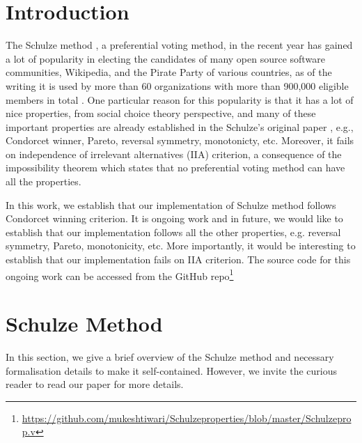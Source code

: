 \documentclass[compsoc,conference,a4paper,10pt,times]{IEEEtran}
\begin{document}
 
\section{Introduction}
    The Schulze method \cite{Schulze:2011:NMC}, a preferential voting method, in the recent year 
    has gained a lot of popularity in electing the candidates of many open source 
    software communities, Wikipedia, and the Pirate Party of various countries, as of the writing it 
    is used by more  than  60 organizations  with  more  than  900,000  eligible  
    members  in  total \cite{schulze2020schulze}. One particular reason for this popularity is that it 
    has a lot of nice properties, from social choice theory perspective, and many of 
    these important properties are already established in the Schulze's original paper \cite{Schulze:2011:NMC}, e.g., Condorcet winner, Pareto, reversal symmetry, monotonicty, 
    etc. Moreover, it fails on independence of 
    irrelevant alternatives (IIA) criterion, a consequence of the impossibility theorem \cite{arrow1950difficulty} which states that no preferential voting 
    method can have all the properties. 

    In this work, we establish that our implementation of Schulze method \cite{Pattinson:2017:SVE}
    follows Condorcet winning criterion. It is ongoing work and in  
    future, we would like to establish that our implementation follows all the other properties, 
    e.g. reversal symmetry, Pareto, monotonicity, etc. 
    More importantly, it would be interesting to establish that our implementation 
    fails on IIA criterion. The 
    source code for this ongoing work can be accessed from the GitHub 
    repo\footnote{\url{https://github.com/mukeshtiwari/Schulzeproperties/blob/master/Schulzeprop.v}}
    
    \section{Schulze Method}
    In this section, we give a brief overview of the Schulze method and 
    necessary formalisation details to make it self-contained. However, we invite the 
    curious reader to read our paper \cite{Pattinson:2017:SVE} for more details. 
    
\end{document}
